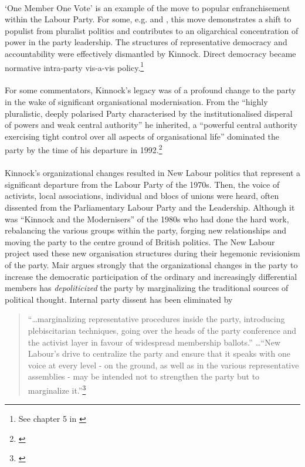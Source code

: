 \documentclass[13pt]{article}
\begin{document}
\begin{onehalfspace}
\paragraph{}`One Member One Vote' is an example of the move to popular enfranchisement within the Labour Party. For some, e.g.  and , this move demonstrates a shift to populist from pluralist politics and contributes to an oligarchical concentration of power in the party leadership. The structures of representative democracy and accountability were effectively dismantled by Kinnock. Direct democracy became normative intra-party vis-a-vis policy.\footnote{See chapter 5 in \cite{Shaw:1994gf}}

\paragraph{}For some commentators, Kinnock's legacy was of a profound change to the party in the wake of significant organisational modernisation. From the ``highly pluralistic, deeply polarised Party characterised by the institutionalised disperal of powers and weak central authority'' he inherited, a ``powerful central authority exercising tight control over all aspects of organisational life'' dominated the party by the time of his departure in 1992.\footnote{\cite[pp. 120]{Shaw:1994gf}}

\paragraph{}Kinnock's organizational changes resulted in New Labour politics that represent a significant departure from the Labour Party of the 1970s. Then, the voice of activists, local associations, individual and blocs of unions were heard, often dissented from the Parliamentary Labour Party and the Leadership. Although it was ``Kinnock and the Modernisers'' of the 1980s who had done the hard work, rebalancing the various groups within the party, forging new relationships and moving the party to the centre ground of British politics. The New Labour project used these new organisation structures during their hegemonic revisionism of the party. Mair argues strongly that the organizational changes in the party to increase the democratic participation of the ordinary and increasingly differential members has \emph{depoliticized} the party by marginalizing the traditional sources of political thought. Internal party dissent has been eliminated by \begin{quote}``\ldots marginalizing representative procedures inside the party, introducing plebiscitarian techniques, going over the heads of the party conference and the activist layer in favour of widespread membership ballots.'' \dots ``New Labour's drive to centralize the party and ensure that it speaks with one voice at every level - on the ground, as well as in the various representative assemblies - may be intended not to strengthen the party but to marginalize it.''\footnote{\cite[pp. 22 \& 26]{mairnlr2}}\end{quote}


\end{onehalfspace}
\end{document}
